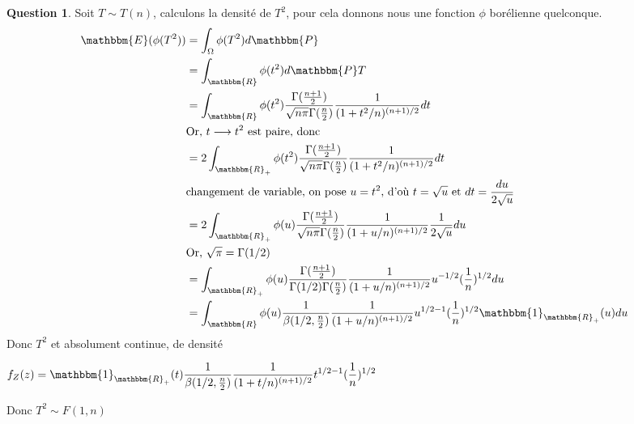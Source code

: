 \documentclass[12pt]{article}
\newcommand{\R}{\mathbbm{R}}
\newcommand{\1}{\mathbbm{1}}
\newcommand{\E}{\mathbbm{E}}
\newcommand{\Prob}{\mathbbm{P}}
\theoremstyle{definition}\newtheorem{defn}{Définition}
\theoremstyle{definition}\newtheorem{exm}{Exemple}
\theoremstyle{definition}\newtheorem{rem}{Remarque}
\theoremstyle{definition}\newtheorem{algo}{Algorithme}
\theoremstyle{remark}\newtheorem{exo}{Exercice}
\theoremstyle{remark}\newtheorem{nota}{Notation}
\theoremstyle{definition}\newtheorem{1q}{Question}
\theoremstyle{definition}\newtheorem{2q}{Question}
\theoremstyle{definition}\newtheorem{3q}{Question}
\theoremstyle{definition}\newtheorem{4q}{Question}
\theoremstyle{definition}\newtheorem{2qs1}{}
\theoremstyle{definition}\newtheorem{2qs2}{}
\theoremstyle{definition}\newtheorem{2qs3}{}
\theoremstyle{definition}\newtheorem{2qs4}{}
\theoremstyle{definition}\newtheorem{4qs2}{}
\theoremstyle{definition}\newtheorem{4qs3}{}
\begin{document}
\begin{3q}
Soit $T\sim T(n)$, calculons la densité de $T^2$, pour cela donnons nous une fonction $\phi$ borélienne quelconque.
\begin{align*}
\E(\phi(T^2)) &= \int_{\Omega}\phi(T^2)d\Prob \\
&= \int_\R\phi(t^2)d\Prob T \\
&= \displaystyle \int_\R\phi(t^2)\frac{\Gamma(\frac{n+1}{2})}{\sqrt{n\pi}\Gamma(\frac{n}{2})}\frac{1}{(1+t^2/n)^{(n+1)/2}}dt\\
& \text{Or, $t \longrightarrow t^2$ est paire, donc}\\
&= 2\displaystyle \int_{\R_+}\phi(t^2)\frac{\Gamma(\frac{n+1}{2})}{\sqrt{n\pi}\Gamma(\frac{n}{2})}\frac{1}{(1+t^2/n)^{(n+1)/2}}dt\\
& \text{changement de variable, on pose $u=t^2$, d'où $t=\sqrt{u}$ et $dt = \frac{du}{2\sqrt{u}}$}\\
&= 2\displaystyle \int_{\R_+}\phi(u)\frac{\Gamma(\frac{n+1}{2})}{\sqrt{n\pi}\Gamma(\frac{n}{2})}\frac{1}{(1+u/n)^{(n+1)/2}}\frac{1}{2\sqrt{u}}du\\
& \text{Or, $\sqrt{\pi}=\Gamma(1/2)$}\\
&=\displaystyle \int_{\R_+}\phi(u)\frac{\Gamma(\frac{n+1}{2})}{\Gamma(1/2)\Gamma(\frac{n}{2})}\frac{1}{(1+u/n)^{(n+1)/2}}u^{-1/2}(\frac{1}{n})^{1/2}du\\
&=\displaystyle \int_{\R}\phi(u)\frac{1}{\beta(1/2,\frac{n}{2})}\frac{1}{(1+u/n)^{(n+1)/2}}u^{1/2-1}(\frac{1}{n})^{1/2}\1_{\R_+}(u)du\\
\end{align*}
Donc $T^2$ et absolument continue, de densité
\begin{center}$\displaystyle f_Z(z) = \1_{\R_+}(t)\frac{1}{\beta(1/2,\frac{n}{2})}\frac{1}{(1+t/n)^{(n+1)/2}}t^{1/2-1}(\frac{1}{n})^{1/2}$\end{center}
Donc $T^2 \sim F(1,n)$
\end{3q}
\end{document}
